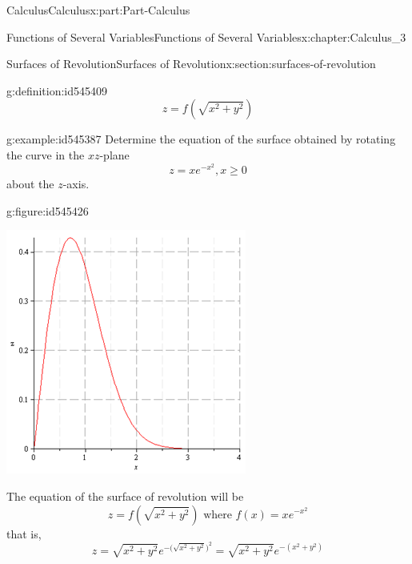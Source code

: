 \documentclass[oneside,10pt,]{book}
\numberwithin{equation}{section}
\begin{document}
\begin{partptx}{Calculus}{}{Calculus}{}{}{x:part:Part-Calculus}
\begin{chapterptx}{Functions of Several Variables}{}{Functions of Several Variables}{}{}{x:chapter:Calculus_3}
\begin{sectionptx}{Surfaces of Revolution}{}{Surfaces of Revolution}{}{}{x:section:surfaces-of-revolution}
\begin{definition}{}{g:definition:id545409}
\begin{equation*}
z=f(\sqrt{x^2+y^2})
\end{equation*}
\end{definition}
%
\begin{example}{}{g:example:id545387}%
Determine the equation of the surface obtained by rotating the curve in the \(xz\)-plane%
\begin{equation*}
z=xe^{-x^2}, x\geq 0
\end{equation*}
about the \(z\)-axis.%
\par\smallskip%
\noindent\hypertarget{g:solution:id545428}{}\begin{figureptx}{}{g:figure:id545426}{}%
\begin{image}{0.25}{0.5}{0.25}%
\includegraphics[width=\linewidth]{./Calculus/Images/3/3_example11.png}
\end{image}%
\tcblower
\end{figureptx}%
 The equation of the surface of revolution will be%
\begin{equation*}
z=f(\sqrt{x^2+y^2}) \textrm{ where } f(x)=xe^{-x^2}
\end{equation*}
that is,%
\begin{equation*}
z=\sqrt{x^2+y^2}e^{-\big(\sqrt{x^2+y^2}\big)^2}=\sqrt{x^2+y^2}e^{-(x^2+y^2)}
\end{equation*}

\end{example}
\end{sectionptx}
\end{chapterptx}
\end{partptx}
\end{document}
